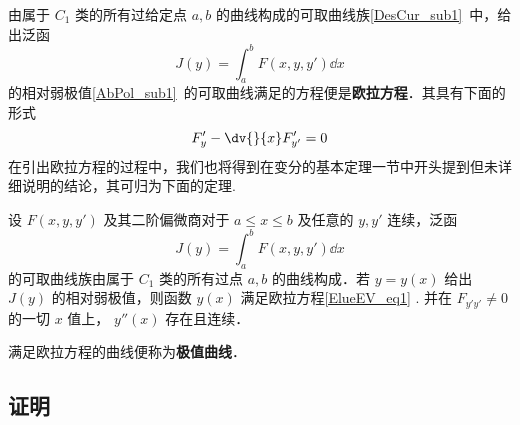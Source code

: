
由属于 $C_1$ 类的所有过给定点 $a,b$ 的曲线构成的可取曲线族\autoref{DesCur_sub1}~中，给出泛函 
\begin{equation}
J(y)=\int_a^bF(x,y,y')\dd x
\end{equation}
的相对弱极值\autoref{AbPol_sub1}~的可取曲线满足的方程便是\textbf{欧拉方程}．其具有下面的形式
\begin{equation}\label{ElueEV_eq1}
F'_y-\dv{}{x}F'_{y'}=0
\end{equation}
在引出欧拉方程的过程中，我们也将得到在变分的基本定理一节中开头提到但未详细说明的结论，其可归为下面的定理.
\begin{theorem}{}
设 $F(x,y,y')$ 及其二阶偏微商对于 $a\leq x\leq b$ 及任意的 $y,y'$ 连续，泛函
\begin{equation}
J(y)=\int_a^b F(x,y,y')\dd x
\end{equation}
的可取曲线族由属于 $C_1$ 类的所有过点 $a,b$ 的曲线构成．若 $y=y(x)$ 给出 $J(y)$ 的相对弱极值，则函数 $y(x)$ 满足欧拉方程\autoref{ElueEV_eq1} .
并在 $F_{y'y'}\neq0$ 的一切 $x$ 值上， $y''(x)$ 存在且连续．

\end{theorem}
满足欧拉方程的曲线便称为\textbf{极值曲线}．
\subsection{证明}